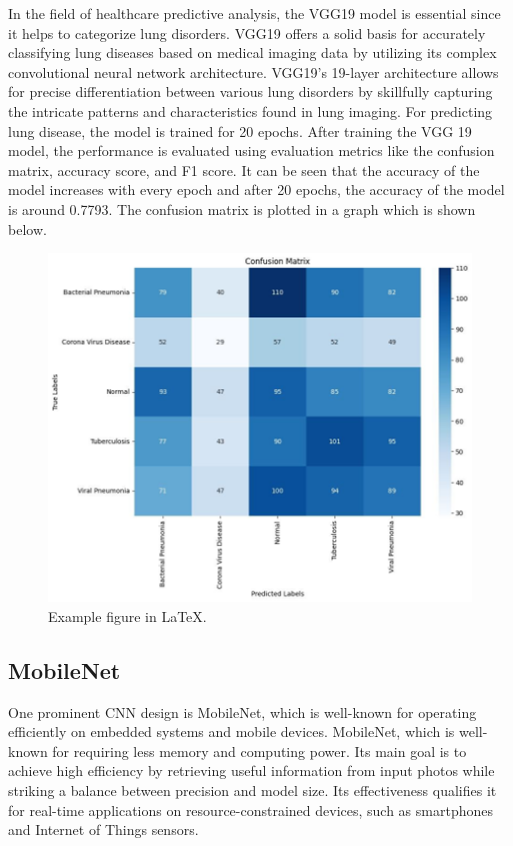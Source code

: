 In the field of healthcare predictive analysis, the VGG19 model is essential since it helps to categorize lung disorders. VGG19 offers a solid basis for accurately classifying lung diseases based on medical imaging data by utilizing its complex convolutional neural network architecture. VGG19's 19-layer architecture allows for precise differentiation between various lung disorders by skillfully capturing the intricate patterns and characteristics found in lung imaging. For predicting lung disease, the model is trained for 20 epochs.
After training the VGG 19 model, the performance is evaluated using evaluation metrics like the confusion matrix, accuracy score, and F1 score.  It can be seen that the accuracy of the model increases with every epoch and after 20 epochs, the accuracy of the model is around 0.7793. The confusion matrix is plotted in a graph which is shown below.
\begin{figure}[ht]
    \centering
    \includegraphics[scale=0.8]{figures/Picture2.png}
    \caption{Example figure in \LaTeX.}
    \label{fig:chart_a}
\end{figure}
\subsection{MobileNet}
One prominent CNN design is MobileNet, which is well-known for operating efficiently on embedded systems and mobile devices.  MobileNet, which is well-known for requiring less memory and computing power. Its main goal is to achieve high efficiency by retrieving useful information from input photos while striking a balance between precision and model size. Its effectiveness qualifies it for real-time applications on resource-constrained devices, such as smartphones and Internet of Things sensors.

